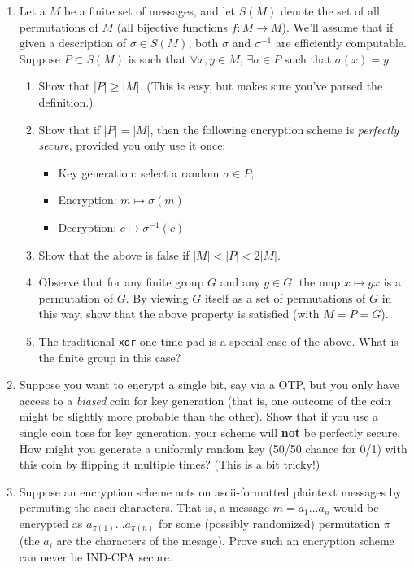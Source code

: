 \documentclass[12pt]{article}
\newcommand{\inv}{^{-1}} %
\begin{document}
\begin{enumerate}
  \item Let a \(M\) be a finite set of messages, and let \(S(M)\) denote the
	set of all permutations of \(M\) (all bijective functions \(f:M\rightarrow
	M\)).  We'll assume that if given a description of \(\sigma\in S(M)\),
	both \(\sigma\) and \(\sigma\inv\) are efficiently computable.  Suppose
	\(P\subset S(M)\) is such that \(\forall x,y\in M\), \(\exists \sigma\in
	P\) such that \(\sigma(x) = y\).
	\begin{enumerate}[noitemsep]
	  \item Show that \(|P|\geq |M|\).  (This is easy, but makes sure you've
		parsed the definition.)
	  \item Show that if \(|P| = |M|\), then the following encryption scheme
		is \emph{perfectly secure}, provided you only use it once:
		\begin{itemize}[noitemsep]
		  \item Key generation: select a random \(\sigma\in P\);
		  \item Encryption: \(m\mapsto \sigma(m)\)
		  \item Decryption: \(c\mapsto \sigma\inv(c)\)
		\end{itemize}
	  \item Show that the above is false if \(|M| < |P| < 2|M|\).
	  \item Observe that for any finite group \(G\) and any \(g\in G\), the
		map \(x\mapsto gx\) is a permutation of \(G\).  By viewing \(G\)
		itself as a set of permutations of \(G\) in this way, show that the
		above property is satisfied (with \(M = P = G\)).
	  \item The traditional \texttt{xor} one time pad is a special case of the
		above.  What is the finite group in this case?
	\end{enumerate}
  \item Suppose you want to encrypt a single bit, say via a OTP, but you only
	have access to a \emph{biased} coin for key generation (that is, one
	outcome of the coin might be slightly more probable than the other).  Show
	that if you use a single coin toss for key generation, your scheme will
	\textbf{not} be perfectly secure.  How might you generate a uniformly
	random key (50/50 chance for 0/1) with this coin by flipping it multiple
	times?  (This is a bit tricky!)

  \item Suppose an encryption scheme acts on ascii-formatted plaintext
	messages by permuting the ascii characters.  That is, a message \(m =
	a_1\dots a_n\) would be encrypted as \(a_{\pi(1)}\dots a_{\pi(n)}\) for
	some (possibly randomized) permutation \(\pi\) (the \(a_i\) are the
	characters of the mesage).  Prove such an encryption scheme can never be
	IND-CPA secure.


\end{enumerate}
\end{document}
